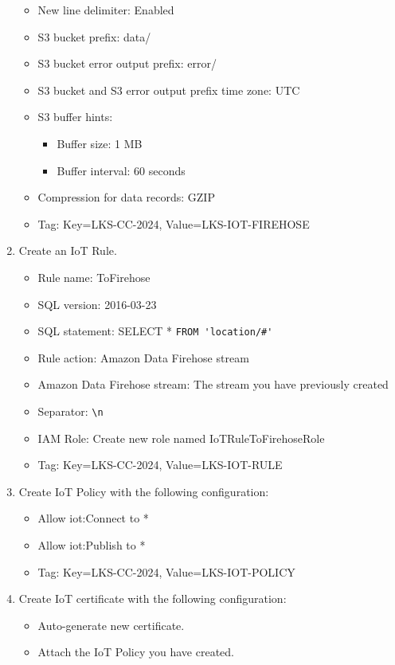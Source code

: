 \documentclass{article}
\begin{document}
\begin{enumerate}
\begin{itemize}
    \item New line delimiter: Enabled
    \item S3 bucket prefix: data/
    \item S3 bucket error output prefix: error/
    \item S3 bucket and S3 error output prefix time zone: UTC
    \item S3 buffer hints:
    \begin{itemize}
      \item Buffer size: 1 MB
      \item Buffer interval: 60 seconds
    \end{itemize}
    \item Compression for data records: GZIP
    \item Tag: Key=LKS-CC-2024, Value=LKS-IOT-FIREHOSE
  \end{itemize}
\item Create an IoT Rule.
  \begin{itemize}
    \item Rule name: ToFirehose
    \item SQL version: 2016-03-23
    \item SQL statement: SELECT * \lstinline{FROM 'location/#'}
    \item Rule action: Amazon Data Firehose stream
    \item Amazon Data Firehose stream: The stream you have previously created
    \item Separator: \lstinline{\n}
    \item IAM Role: Create new role named IoTRuleToFirehoseRole
    \item Tag: Key=LKS-CC-2024, Value=LKS-IOT-RULE
  \end{itemize}
\item Create IoT Policy with the following configuration:
  \begin{itemize}
    \item Allow iot:Connect to *
    \item Allow iot:Publish to *
    \item Tag: Key=LKS-CC-2024, Value=LKS-IOT-POLICY
  \end{itemize}
\item Create IoT certificate with the following configuration:
  \begin{itemize}
    \item Auto-generate new certificate.
    \item Attach the IoT Policy you have created.

\end{itemize}
\end{enumerate}
\end{document}

